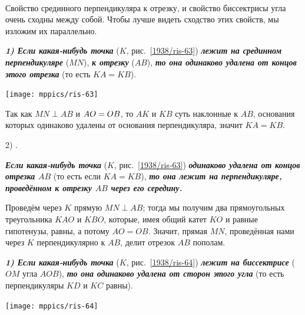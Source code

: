 \documentclass[twoside]{book}
\begin{document}
\paragraph{}\label{1938/58}
Свойство срединного перпендикуляра к отрезку, и свойство биссектрисы угла очень сходны между собой.
Чтобы лучше видеть сходство этих свойств, мы изложим их параллельно.

\medskip

\begin{paracol}{2}

{\sloppy

\textbf{\emph{1) Если какая-нибудь точка}} ($K$, рис.~\ref{1938/ris-63}) \textbf{\emph{лежит на срединном перпендикуляре}} ($MN$), \textbf{\emph{к отрезку}} ($AB$), \textbf{\emph{то она одинаково удалена от концов этого отрезка}} (то есть $KA=KB$).

\bigskip

{\centering
\texttt{[image: mppics/ris-63]}
\label{1938/ris-63}
\addtocounter{figure}{1}
}

\medskip

Так как \mbox{$MN\perp AB$} и $AO\z=OB$, то $AK$ и $KB$ суть наклонные к $AB$, основания которых одинаково удалены от основания перпендикуляра, значит $KA=KB$.

2) .

\textbf{\emph{Если какая-нибудь точка}} ($K$, рис.~\ref{1938/ris-63}) \textbf{\emph{одинаково удалена от концов отрезка $AB$}} (то есть если $KA=KB$), \textbf{\emph{то она лежит на перпендикуляре, проведённом к отрезку $AB$ через его середину.}}

Проведём через $K$ прямую $MN\perp AB$;
тогда мы получим два прямоугольных треугольника $KAO$ и $KBO$, которые, имея общий катет $KO$ и равные гипотенузы, равны, а потому $AO=OB$.
Значит, прямая $MN$, проведённая нами через $K$ перпендикулярно к $AB$, делит отрезок $AB$ пополам.

}

\switchcolumn

{\sloppy

\textbf{\emph{1) Если какая-нибудь точка}} ($K$, рис.~\ref{1938/ris-64}) \textbf{\emph{лежит на биссектрисе}} ($OM$ угла $AOB$), \textbf{\emph{то она одинаково удалена от сторон этого угла}} (то есть перпендикуляры $KD$ и $KC$ равны).

\bigskip

{\centering
\addtocounter{figure}{1}
\texttt{[image: mppics/ris-64]}
\label{1938/ris-64}
\addtocounter{figure}{1}
}

}
\end{paracol}
\end{document}
